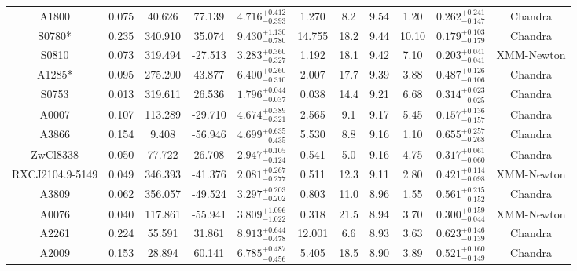 \documentclass{aa}   %
\begin{document}
\begin{table}[h!]
\begin{center}
\begin{tabular}{ c  c  c  c c c c c c c c }
A1800               		&		0.075	&	40.626	&	77.139	& $	4.716^{+0.412}_{-0.393}$  &      1.270	&  8.2	&	9.54	&	1.20	&	$ 0.262^{+0.241}_{-0.147}  $ &	  Chandra     \\
S0780*              		&		0.235	&	340.910	&	35.074	& $	9.430^{+1.130}_{-0.780}$  &     14.755	&  18.2	&	9.44	&	10.10	&	$ 0.179^{+0.103}_{-0.179}  $ &	 Chandra      \\
S0810               		&		0.073	&	319.494	&	-27.513	& $	3.283^{+0.360}_{-0.327}$  &      1.192	&  18.1	&	9.42	&	7.10	&	$ 0.203^{+0.041}_{-0.041}  $ &	 XMM-Newton   \\
A1285*              		&		0.095	&	275.200	&	43.877	& $	6.400^{+0.260}_{-0.310}$  &      2.007	&  17.7	&	9.39	&	3.88	&	$ 0.487^{+0.126}_{-0.106}  $ &	  Chandra     \\
S0753               		&		0.013	&	319.611	&	26.536	& $	1.796^{+0.044}_{-0.037}$  &      0.038	&  14.4	&	9.21	&	6.68	&	$ 0.314^{+0.023}_{-0.025}  $ &	 Chandra      \\
A0007               		&		0.107	&	113.289	&	-29.710	& $	4.674^{+0.389}_{-0.321}$  &      2.565	&  9.1	&	9.17	&	5.45	&	$ 0.157^{+0.136}_{-0.157}  $ &	 Chandra      \\
A3866               		&		0.154	&	9.408	&	-56.946	& $	4.699^{+0.635}_{-0.435}$  &      5.530	&  8.8	&	9.16	&	1.10	&	$ 0.655^{+0.257}_{-0.268}  $ &	  Chandra     \\
ZwCl8338            		&		0.050	&	77.722	&	26.708	& $	2.947^{+0.105}_{-0.124}$  &      0.541	&  5.0	&	9.16	&	4.75	&	$ 0.317^{+0.061}_{-0.060}  $ &	  Chandra     \\
RXCJ2104.9-5149     		&		0.049	&	346.393	&	-41.376	& $	2.081^{+0.267}_{-0.277}$  &      0.511	&  12.3	&	9.11	&	2.80	&	$ 0.421^{+0.114}_{-0.098}  $ &	  XMM-Newton  \\
A3809               		&		0.062	&	356.057	&	-49.524	& $	3.297^{+0.203}_{-0.202}$  &      0.803	&  11.0	&	8.96	&	1.55	&	$ 0.561^{+0.215}_{-0.152}  $ &	  Chandra     \\
A0076               		&		0.040	&	117.861	&	-55.941	& $	3.809^{+1.096}_{-1.022}$  &      0.318	&  21.5	&	8.94	&	3.70	&	$ 0.300^{+0.159}_{-0.044}  $ &	  XMM-Newton  \\
A2261               		&		0.224	&	55.591	&	31.861	& $	8.913^{+0.644}_{-0.478}$  &     12.001	&  6.6	&	8.93	&	3.63	&	$ 0.623^{+0.146}_{-0.139}  $ &	  Chandra     \\
A2009               		&		0.153	&	28.894	&	60.141	& $	6.785^{+0.487}_{-0.456}$  &      5.405	&  18.5	&	8.90	&	3.89	&	$ 0.521^{+0.160}_{-0.149}  $ &	  Chandra     \\

\end{tabular}
\end{center}
\end{table}
\end{document}
